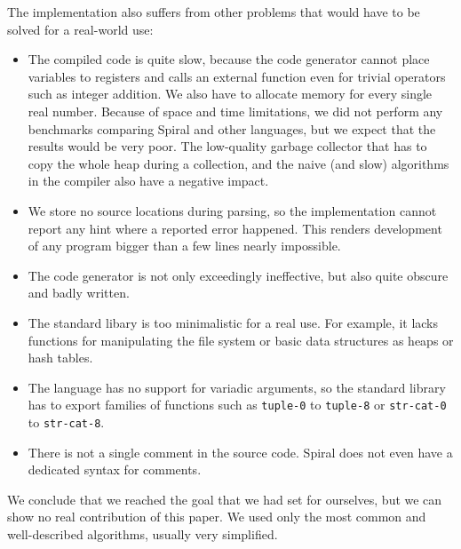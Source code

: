 The implementation also suffers from other problems that would have to be solved
for a real-world use:

\begin{itemize}
  \item The compiled code is quite slow, because the code generator cannot place
    variables to registers and calls an external function even for trivial
    operators such as integer addition. We also have to allocate memory for
    every single real number. Because of space and time limitations, we did not
    perform any benchmarks comparing Spiral and other languages, but we expect
    that the results would be very poor. The low-quality garbage collector
    that has to copy the whole heap during a collection, and the naive (and
    slow) algorithms in the compiler also have a negative impact.

  \item We store no source locations during parsing, so the implementation
    cannot report any hint where a reported error happened. This renders
    development of any program bigger than a few lines nearly impossible.

  \item The code generator is not only exceedingly ineffective, but also quite
    obscure and badly written.

  \item The standard libary is too minimalistic for a real use. For example, it
    lacks functions for manipulating the file system or basic data structures as
    heaps or hash tables.

  \item The language has no support for variadic arguments, so the standard
    library has to export families of functions such as \texttt{tuple-0} to
    \texttt{tuple-8} or \texttt{str-cat-0} to \texttt{str-cat-8}.
    
  \item There is not a single comment in the source code. Spiral does not even
    have a dedicated syntax for comments.
\end{itemize}

We conclude that we reached the goal that we had set for ourselves, but we can
show no real contribution of this paper. We used only the most common and
well-described algorithms, usually very simplified.
